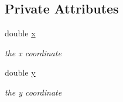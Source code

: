 \subsection*{Private Attributes}
\begin{DoxyCompactItemize}
\item 
double \mbox{\hyperlink{class_jinks_draw_1_1_point_a49a46c3d78c0c68260d55dacdee458de}{x}}
\begin{DoxyCompactList}\small\item\em the x coordinate \end{DoxyCompactList}\item 
double \mbox{\hyperlink{class_jinks_draw_1_1_point_ad2dbfbd07baf41cfe82737a4f347bab5}{y}}
\begin{DoxyCompactList}\small\item\em the y coordinate \end{DoxyCompactList}\end{DoxyCompactItemize}
